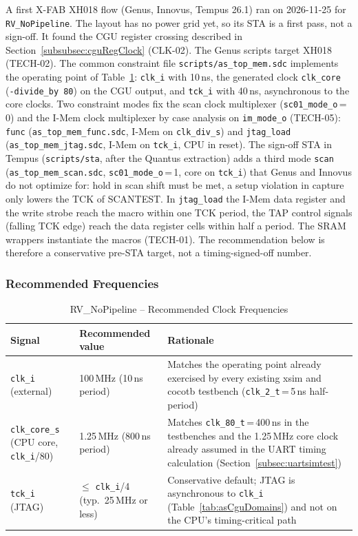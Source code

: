A first X-FAB XH018 flow (Genus, Innovus, Tempus 26.1) ran on 2026-11-25
for \texttt{RV\_NoPipeline}. The layout has no power grid yet, so its STA
is a first pass, not a sign-off. It found the CGU register crossing
described in Section~\ref{subsubsec:cguRegClock} (CLK-02).
The Genus scripts target XH018 (TECH-02). The common constraint file
\texttt{scripts/as\_top\_mem.sdc} implements the operating point of
Table~\ref{tab:asNoPipelineClk}: \texttt{clk\_i} with 10\,ns, the generated
clock \texttt{clk\_core} (\texttt{-divide\_by 80}) on the CGU output, and
\texttt{tck\_i} with 40\,ns, asynchronous to the core clocks. Two constraint
modes fix the scan clock multiplexer (\texttt{sc01\_mode\_o}\,=\,0) and the
I-Mem clock multiplexer by case analysis on \texttt{im\_mode\_o} (TECH-05):
\texttt{func} (\texttt{as\_top\_mem\_func.sdc}, I-Mem on
\texttt{clk\_div\_s}) and \texttt{jtag\_load} (\texttt{as\_top\_mem\_jtag.sdc},
I-Mem on \texttt{tck\_i}, CPU in reset). The sign-off STA in Tempus
(\texttt{scripts/sta}, after the Quantus extraction) adds a third mode
\texttt{scan} (\texttt{as\_top\_mem\_scan.sdc}, \texttt{sc01\_mode\_o}\,=\,1,
core on \texttt{tck\_i}) that Genus and Innovus do not optimize for: hold
in scan shift must be met, a setup violation in capture only lowers the TCK
of SCANTEST. In \texttt{jtag\_load} the I-Mem data
register and the write strobe reach the macro within one TCK period, the TAP
control signals (falling TCK edge) reach the data register cells within half
a period. The SRAM wrappers instantiate the macros (TECH-01).
The recommendation below is therefore a conservative pre-STA target, not a
timing-signed-off number.

\subsubsection{Recommended Frequencies}

\begin{table}[H]
\caption{RV\_NoPipeline -- Recommended Clock Frequencies}
\label{tab:asNoPipelineClk}
\centering
\begin{tabularx}{\textwidth}{|X |X |X|}
  \hline
  Signal & Recommended value & Rationale \\
  \hline
  \hline
  \texttt{clk\_i} (external) & 100\,MHz (10\,ns period) &
    Matches the operating point already exercised by every existing xsim
    and cocotb testbench (\texttt{clk\_2\_t}\,=\,5\,ns half-period) \\
  \hline
  \texttt{clk\_core\_s} (CPU core, \texttt{clk\_i}/80) & 1.25\,MHz (800\,ns period) &
    Matches \texttt{clk\_80\_t}\,=\,400\,ns in the testbenches and the
    1.25\,MHz core clock already assumed in the UART timing calculation
    (Section~\ref{subsec:uartsimtest}) \\
  \hline
  \texttt{tck\_i} (JTAG) & $\leq$ \texttt{clk\_i}/4 (typ.\ 25\,MHz or less) &
    Conservative default; JTAG is asynchronous to \texttt{clk\_i}
    (Table~\ref{tab:asCguDomains}) and not on the CPU's timing-critical path \\
  \hline
\end{tabularx}
\end{table}

